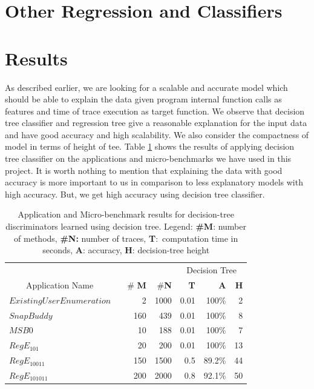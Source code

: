 \documentclass{article}
\begin{document}
\section{Other Regression and Classifiers}

\section{Results}
As described earlier, we are looking for a scalable and accurate model which should
be able to explain the data given program internal function calls as features and time
of trace execution as target function. We observe that decision tree classifier and
regression tree give a reasonable explanation for the input data and have good
accuracy and high scalability. We also consider the compactness of model in
terms of height of tee. Table \ref{table7-1} shows the results of applying decision
tree classifier on the applications and micro-benchmarks we have used in this project.
It is worth nothing to mention that explaining the data with good accuracy is more
important to us in comparison to less explanatory models with high accuracy. But, we
get high accuracy using decision tree classifier. 

\begin{table}[t]
  \centering
  \caption{Application and Micro-benchmark results for decision-tree discriminators learned
    using decision tree. 
    Legend: \textbf{\#M}: number of methods, \textbf{\#N:} number of traces,
    \textbf{T}:\ computation time in seconds, \textbf{A}: accuracy, 
    \textbf{H}: decision-tree height %
   }
  \label{table7-1}
  \begin{tabular}{ || l | r | r || r | r | r ||}
    \hline
    &       &    & \multicolumn{3}{c||}{Decision Tree}\\
    ~~~~Application Name~~~~~~ & \# \textbf{M} & \#\textbf{N} & \textbf{T} & \textbf{A} & \textbf{H} \\ \hline
     $Existing User Enumeration$ & 2 & 1000 & 0.01 & 100\% & 2  \\ \hline
    $SnapBuddy$ & 160 & 439 & 0.01 & 100\% & 8  \\ \hline
    $MSB0$ & 10 & 188 & 0.01 & 100\% & 7  \\ \hline
    $RegE_{101}$ & 20 & 200 & 0.01 & 100\% & 13 \\ \hline
    $RegE_{10011}$ & 150 & 1500 & 0.5 & 89.2\% & 44  \\ \hline
    $RegE_{101011}$ & 200 & 2000 & 0.8 & 92.1\% & 50 \\ \hline
    \end{tabular}
\end{table}
\end{document}

